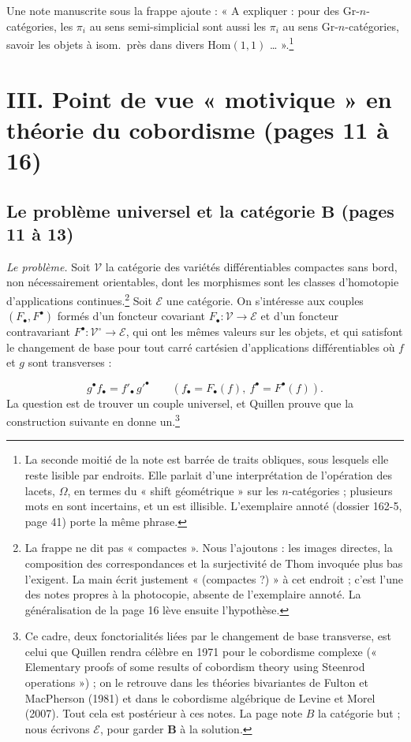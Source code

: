 \documentclass[11pt,a4paper]{article}
\begin{document}
Une note manuscrite sous la frappe ajoute : « A expliquer : pour des
Gr-$n$-catégories, les $\pi_i$ au sens semi-simplicial sont aussi les $\pi_i$
au sens Gr-$n$-catégories, savoir les objets à isom.\ près dans divers
$\mathrm{Hom}(1, 1)$ … ».\footnote{La seconde moitié de la note est barrée de
traits obliques, sous lesquels elle reste lisible par endroits. Elle parlait
d'une interprétation de l'opération des lacets, $\Omega$, en termes du
« shift géométrique » sur les $n$-catégories ; plusieurs mots en sont
incertains, et un est illisible. L'exemplaire annoté (dossier 162-5, page 41)
porte la même phrase.}

\section*{III. Point de vue « motivique » en théorie du cobordisme (pages 11 à 16)}

\subsection*{Le problème universel et la catégorie $\mathbf{B}$ (pages 11 à 13)}

\emph{Le problème.} Soit $\mathcal{V}$ la catégorie des variétés
différentiables compactes sans bord, non nécessairement orientables, dont les
morphismes sont les classes d'homotopie d'applications continues.\footnote{La
frappe ne dit pas « compactes ». Nous l'ajoutons : les images directes, la
composition des correspondances et la surjectivité de Thom invoquée plus bas
l'exigent. La main écrit justement « (compactes ?) » à cet endroit ; c'est
l'une des notes propres à la photocopie, absente de l'exemplaire annoté. La
généralisation de la page 16 lève ensuite l'hypothèse.} Soit $\mathcal{E}$ une
catégorie. On s'intéresse aux couples $(F_\bullet, F^\bullet)$ formés d'un
foncteur covariant $F_\bullet : \mathcal{V} \to \mathcal{E}$ et d'un foncteur
contravariant $F^\bullet : \mathcal{V}^{\circ} \to \mathcal{E}$, qui ont les
mêmes valeurs sur les objets, et qui satisfont le changement de base pour tout
carré cartésien d'applications différentiables où $f$ et $g$ sont transverses :


\[
g^{\bullet} f_{\bullet} = f'_{\bullet}\, g'^{\bullet}
\qquad (f_\bullet = F_\bullet(f),\ f^\bullet = F^\bullet(f)).
\]
La question est de trouver un couple universel, et Quillen prouve que la
construction suivante en donne un.\footnote{Ce cadre, deux fonctorialités liées
par le changement de base transverse, est celui que Quillen rendra célèbre en
1971 pour le cobordisme complexe (« Elementary proofs of some results of
cobordism theory using Steenrod operations ») ; on le retrouve dans les
théories bivariantes de Fulton et MacPherson (1981) et dans le cobordisme
algébrique de Levine et Morel (2007). Tout cela est postérieur à ces notes. La
page note $B$ la catégorie but ; nous écrivons $\mathcal{E}$, pour garder
$\mathbf{B}$ à la solution.}
\end{document}
